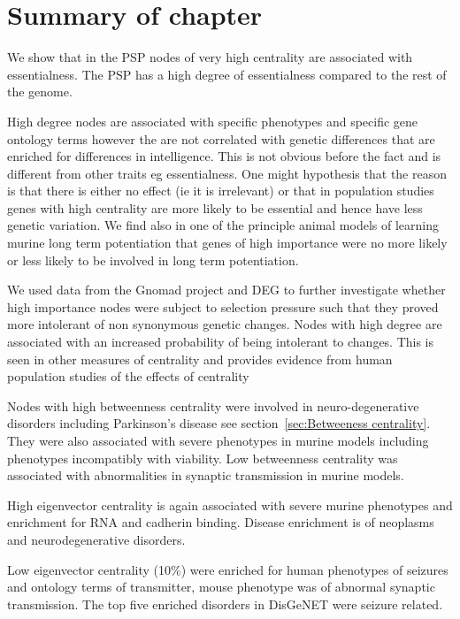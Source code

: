 \clearpage

\section{Summary of chapter}

We show that in the PSP nodes of very high centrality are associated with essentialness. The PSP has a high degree of essentialness compared to the rest of the genome. 

High degree nodes are associated with specific phenotypes and specific gene ontology terms however the are not correlated with genetic differences that are enriched for differences in intelligence. This is not obvious before the fact and is different from other traits eg essentialness. One might hypothesis that the reason is that there is either no effect (ie it is irrelevant) or that in population studies genes with high centrality are more likely to be essential and hence have less genetic variation. We find also in one of the principle animal models of learning murine long term potentiation that genes of high importance were no more likely or less likely to be involved in long term potentiation.

We used data from the Gnomad project and DEG to further investigate whether high importance nodes were subject to selection pressure such that they proved more intolerant of non synonymous genetic changes. Nodes with high degree are associated with an increased probability of being intolerant to changes. This is seen in other measures of centrality and provides evidence from human population studies of the effects of centrality

Nodes with high betweenness centrality were involved in neuro-degenerative disorders including Parkinson's disease see section~\ref{sec:Betweeness centrality}. They were also associated with severe phenotypes in murine models including phenotypes incompatibly with viability. Low betweenness centrality was associated with abnormalities in synaptic transmission in murine models. 

High eigenvector centrality is again associated with severe murine phenotypes and enrichment for RNA and cadherin binding. Disease enrichment is of neoplasms and neurodegenerative disorders. 

Low eigenvector centrality (10\%) were enriched for human phenotypes of seizures and ontology terms of transmitter, mouse phenotype was of abnormal synaptic transmission. The top five enriched disorders in DisGeNET were seizure related. 

